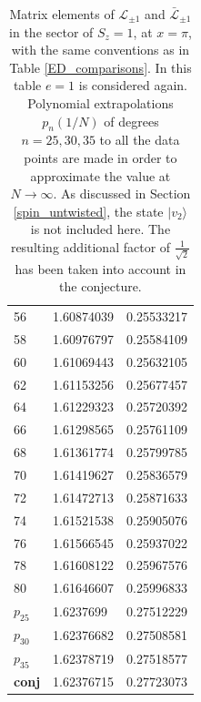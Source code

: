 \documentclass[a4paper,10pt]{article}
\newcommand{\KSgen}{\mathcal{L}}
\begin{document}
\begin{table}[H]
\begin{minipage}{0.5\textwidth}
\begin{tabular}{lll}
 56   & 1.60874039 & 0.25533217 \\
 58   & 1.60976797 & 0.25584109 \\
 60   & 1.61069443 & 0.25632105 \\
 62   & 1.61153256 & 0.25677457 \\
 64   & 1.61229323 & 0.25720392 \\
 66   & 1.61298565 & 0.25761109 \\
 68   & 1.61361774 & 0.25799785 \\
 70   & 1.61419627 & 0.25836579 \\
 72   & 1.61472713 & 0.25871633 \\
 74   & 1.61521538 & 0.25905076 \\
 76   & 1.61566545 & 0.25937022 \\
 78   & 1.61608122 & 0.25967576 \\
 80   & 1.61646607 & 0.25996833 \\
 $p_{25}$ & 1.6237699  & 0.27512229 \\
 $p_{30}$ & 1.62376682 & 0.27508581 \\
 $p_{35}$ & 1.62378719 & 0.27518577 \\
 \bf{conj }& 1.62376715  & 0.27723073\\
\end{tabular}
\end{minipage} \hfill
\caption{
Matrix elements of $\KSgen_{\pm 1}$ and $\bar{\KSgen}_{\pm 1}$ in the sector of $S_z=1$, at $x=\pi$, with the same conventions as in Table \ref{ED_comparisons}. In this table $e=1$ is considered again. Polynomial extrapolations 
 $p_n(1/N)$ of degrees $n= 25, 30, 35$ to all the data points are made in order to approximate the value at $N \rightarrow \infty$. As discussed in Section \ref{spin_untwisted}, the state $|v_2\rangle$ is not included here. The resulting additional factor of $\frac{1}{\sqrt{2}}$ has been taken into account in the conjecture.
%
}\label{level1_opposite}
\end{table}
\end{document}
